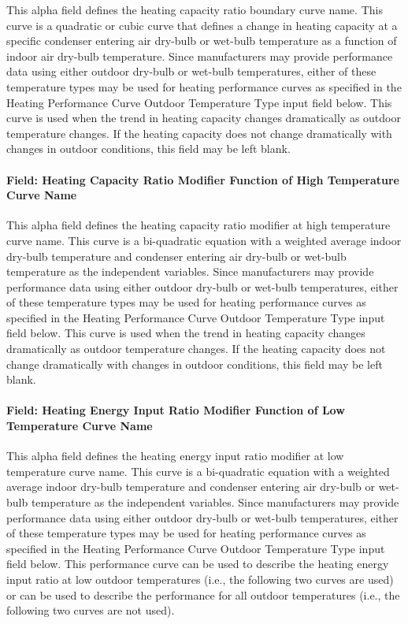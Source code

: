 This alpha field defines the heating capacity ratio boundary curve name. This curve is a quadratic or cubic curve that defines a change in heating capacity at a specific condenser entering air dry-bulb or wet-bulb temperature as a function of indoor air dry-bulb temperature. Since manufacturers may provide performance data using either outdoor dry-bulb or wet-bulb temperatures, either of these temperature types may be used for heating performance curves as specified in the Heating Performance Curve Outdoor Temperature Type input field below. This curve is used when the trend in heating capacity changes dramatically as outdoor temperature changes. If the heating capacity does not change dramatically with changes in outdoor conditions, this field may be left blank.

\paragraph{Field: Heating Capacity Ratio Modifier Function of High Temperature Curve Name}\label{field-heating-capacity-ratio-modifier-function-of-high-temperature-curve-name}

This alpha field defines the heating capacity ratio modifier at high temperature curve name. This curve is a bi-quadratic equation with a weighted average indoor dry-bulb temperature and condenser entering air dry-bulb or wet-bulb temperature as the independent variables. Since manufacturers may provide performance data using either outdoor dry-bulb or wet-bulb temperatures, either of these temperature types may be used for heating performance curves as specified in the Heating Performance Curve Outdoor Temperature Type input field below. This curve is used when the trend in heating capacity changes dramatically as outdoor temperature changes. If the heating capacity does not change dramatically with changes in outdoor conditions, this field may be left blank.

\paragraph{Field: Heating Energy Input Ratio Modifier Function of Low Temperature Curve Name}\label{field-heating-energy-input-ratio-modifier-function-of-low-temperature-curve-name}

This alpha field defines the heating energy input ratio modifier at low temperature curve name. This curve is a bi-quadratic equation with a weighted average indoor dry-bulb temperature and condenser entering air dry-bulb or wet-bulb temperature as the independent variables. Since manufacturers may provide performance data using either outdoor dry-bulb or wet-bulb temperatures, either of these temperature types may be used for heating performance curves as specified in the Heating Performance Curve Outdoor Temperature Type input field below. This performance curve can be used to describe the heating energy input ratio at low outdoor temperatures (i.e., the following two curves are used) or can be used to describe the performance for all outdoor temperatures (i.e., the following two curves are not used).

